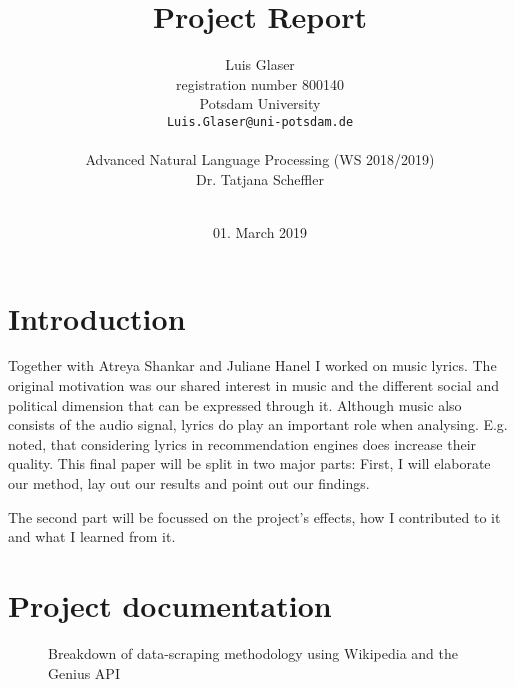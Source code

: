 \documentclass[11pt,a4paper]{article}
\title{Project Report}
\author{Luis Glaser\\
  registration number 800140 \\
  Potsdam University \\
  {\tt Luis.Glaser@uni-potsdam.de} \\
  \\
  Advanced Natural Language Processing (WS 2018/2019) \\
  Dr. Tatjana Scheffler \\
  \\}
\date{01. March 2019}
\begin{document}
\maketitle

\tableofcontents


\section{Introduction}
Together with Atreya Shankar and Juliane Hanel I worked on music lyrics. The original motivation was our shared interest in music and the different social and political dimension that can be expressed through it. Although music also consists of the audio signal, lyrics do play an important role when analysing. E.g. \citet{DBLP:conf/coling/FellS14} noted, that considering lyrics in recommendation engines does increase their quality.
This final paper will be split in two major parts: First, I will elaborate our method, lay out our results and point out our findings.

The second part will be focussed on the project's effects, how I contributed to it and what I learned from it.
\section{Project documentation}
\begin{figure}
\begin{adjustbox}{width=0.5\textwidth}
\end{adjustbox}
    \caption{Breakdown of data-scraping methodology using Wikipedia and the Genius API}	
\end{figure}
\end{document}

